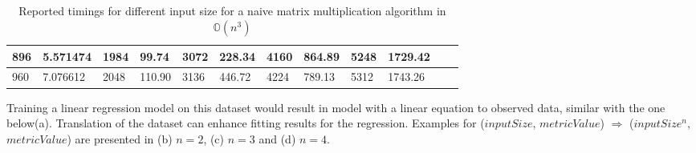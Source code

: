 \begin{table}[H]
\begin{center}
{\begin{tabular}{|l|l|l|l|l|l|l|l|l|l|l|l|}
896                                                  & 5.571474 & 1984                                                 & 99.74  & 3072                                                 & 228.34 & 4160                                                 & 864.89 & 5248                                                 & 1729.42 &                                                      &         \\ \hline
960                                                  & 7.076612 & 2048                                                 & 110.90 & 3136                                                 & 446.72 & 4224                                                 & 789.13 & 5312                                                 & 1743.26 &                                                      &         \\ \hline
\end{tabular}
}
\end{center}
\caption{Reported timings for different input size for a naive matrix multiplication algorithm in $\mathbb{O}(n^{3})$}
\end{table}

Training a linear regression model on this dataset would result in model with a linear equation to observed data, similar with the one below(a). Translation of the dataset can enhance fitting results for the regression. Examples for ($inputSize$, $metricValue$) $ \Rightarrow $ ($inputSize^{n}$, $metricValue$) are presented in (b) $n = 2$, (c) $n = 3$ and (d) $n = 4$.


